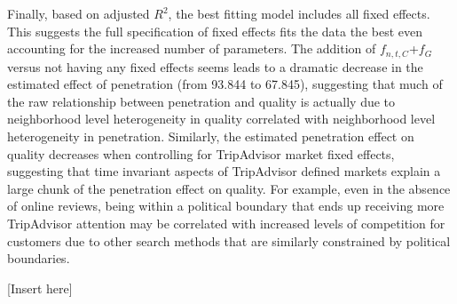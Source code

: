 \documentclass[mksc,blindrev]{informs3} %
\begin{document}
Finally, based on adjusted $R^2$, the best fitting model includes all fixed effects. This suggests the full specification of fixed effects fits the data the best even accounting for the increased number of parameters. The addition of $f_{n,t,C}$+$f_{G}$ versus not having any fixed effects seems leads to a dramatic decrease in the estimated effect of penetration (from 93.844 to 67.845), suggesting that much of the raw relationship between penetration and quality is actually due to neighborhood level heterogeneity in quality correlated with neighborhood level heterogeneity in penetration. Similarly, the estimated penetration effect on quality decreases when controlling for TripAdvisor market fixed effects, suggesting that time invariant aspects of TripAdvisor defined markets explain a large chunk of the penetration effect on quality. For example, even in the absence of online reviews, being within a political boundary that ends up receiving more TripAdvisor attention may be correlated with increased levels of competition for customers due to other search methods that are similarly constrained by political boundaries. %

[Insert  here]

\end{document}
